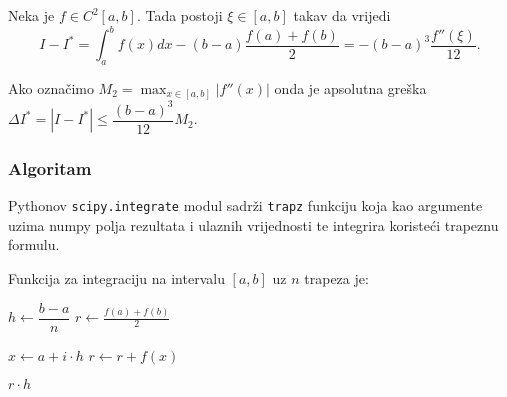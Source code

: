 Neka je $f\in C^2[a,b]$. Tada postoji $\xi \in [a,b]$ takav da vrijedi
$$
I - I^* = \int_a^b f(x) dx - (b-a)\dfrac{f(a)+f(b)}{2} = -(b-a)^3\dfrac{f''(\xi)}{12}.
$$

Ako označimo $\displaystyle M_2 = \max_{x\in[a,b]}|f''(x)|$ onda je apsolutna
greška $\displaystyle \Delta I^* = |I - I^*| \leq \dfrac{(b-a)^3}{12}M_2.$

\subsubsection{Algoritam}

Pythonov \verb|scipy.integrate| modul sadrži \verb|trapz| funkciju koja kao
argumente uzima numpy polja rezultata i ulaznih vrijednosti te integrira
koristeći trapeznu formulu.

Funkcija za integraciju na intervalu $[a, b]$ uz $n$ trapeza je:
\begin{algorithmic}
    \State $h \gets \dfrac{b - a}{n}$
    \State $r \gets \frac{f(a) + f(b)}{2}$
    
      \State $x \gets a + i \cdot h$
      \State $r \gets r + f(x)$
    \EndFor
    
    \State \Return $r \cdot h$
\EndFunction
\end{algorithmic}
